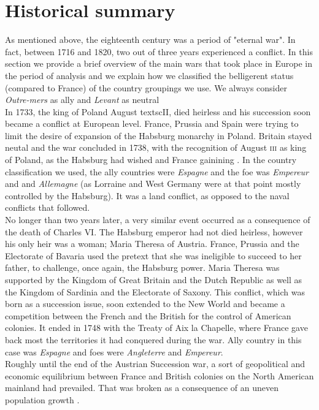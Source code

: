 \documentclass[12pt,a4paper,notitlepage,english]{article}
\begin{document}
\section{Historical summary} \label{historical_summary}
As mentioned above, the eighteenth century was a period of "eternal war".
In fact, between 1716 and 1820, two out of three years experienced a conflict.
In this section we provide a brief overview of the main wars that took place in Europe in the period of analysis and we explain how we classified the belligerent status (compared to France) of the country groupings we use. We always consider \textit{Outre-mers} as ally and \textit{Levant} as neutral\\
In 1733, the king of Poland August textsc{II}, died heirless and his succession soon became a conflict at European level.
France, Prussia and Spain were trying to limit the desire of expansion of the Habsburg monarchy in Poland. Britain stayed neutal and the war concluded in 1738, with the recognition of August \textsc{iii} as king of Poland, as the Habsburg had wished and France gainining .
In the country classification we used, the ally countries were \textit{Espagne}  and the foe was \textit{Empereur} and and \textit{Allemagne} (as Lorraine and West Germany were at that point mostly controlled by the Habsburg).
It was a land conflict, as opposed to the naval conflicts that followed. \\
No longer than two years later, a very similar event occurred as a consequence of the death of Charles \textsc{VI}.
The Habsburg emperor had not died heirless, however his only heir was a woman; Maria Theresa of Austria.
France, Prussia and the Electorate of Bavaria used the pretext that she was ineligible to succeed to her father, to challenge, once again, the Habsburg power.
Maria Theresa was supported by the Kingdom of Great Britain and the Dutch Republic as well as the Kingdom of Sardinia and the Electorate of Saxony.
This conflict, which was born as a succession issue, soon extended to the New World and became a competition between the French and the British for the control of American colonies.
It ended in 1748 with the Treaty of Aix la Chapelle, where France gave back most the territories it had conquered during the war.
Ally country in this case was \textit{Espagne} and foes were \textit{Angleterre} and \textit{Empereur}. \\
Roughly until the end of the Austrian Succession war, a sort of geopolitical and economic equilibrium between France and British colonies on the North American mainland had prevailed. That was broken as a consequence of an uneven population growth \citep{findlay2009power}.
\end{document}
